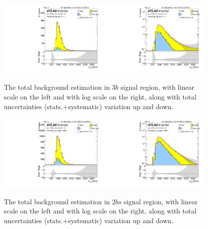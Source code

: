 \begin{figure}
\begin{center}
\includegraphics[width=0.48\textwidth,angle=-90]{figures/boosted/Signal_Syst/Moriond_bkg_9_ThreeTag_Signal_mHH_l_blind.pdf}
\includegraphics[width=0.48\textwidth,angle=-90]{figures/boosted/Signal_Syst/Moriond_bkg_9_ThreeTag_Signal_mHH_l_1_blind.pdf}
\caption{The total background estimation in $3b$ signal region, with linear scale on the left and with log scale on the right, along with total uncertainties (stats.$+$systematic) variation up and down.}
\label{fig:FinalBkg_sys-3b}
\end{center}
\end{figure}


\begin{figure}
\begin{center}
\includegraphics[width=0.48\textwidth,angle=-90]{figures/boosted/Signal_Syst/Moriond_bkg_9_TwoTag_split_Signal_mHH_l_blind.pdf}
\includegraphics[width=0.48\textwidth,angle=-90]{figures/boosted/Signal_Syst/Moriond_bkg_9_TwoTag_split_Signal_mHH_l_1_blind.pdf}
\caption{The total background estimation in $2bs$ signal region, with linear scale on the left and with log scale on the right, along with total uncertainties (stats.$+$systematic) variation up and down.}
\label{fig:FinalBkg_sys-2b}
\end{center}
\end{figure}

